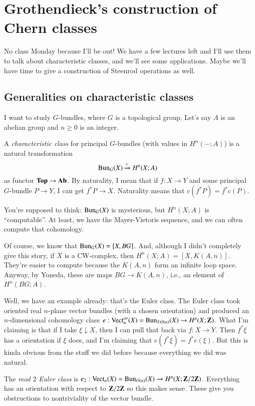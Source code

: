 \section{Grothendieck's construction of Chern classes}
No class Monday because I'll be out!
We have a few lectures left and I'll use them to talk about characteristic classes, and we'll see some applications.
Maybe we'll have time to give a construction of Steenrod operations as well.
\subsection{Generalities on characteristic classes}
I want to study $G$-bundles, where $G$ is a topological group.
Let's say $A$ is an abelian group and $n\geq 0$ is an integer.
\begin{definition}
    A \emph{characteristic class} for principal $G$-bundles (with values in $H^n(-;A)$) is a natural transformation
    $$
    \mathrm{Bun}_G(X) \xrightarrow{{c}} H^n(X;A)
    $$
    as functor $\mathbf{Top}\to \mathbf{Ab}$.
    By naturality, I mean that if $f:X\to Y$ and some principal $G$-bundle $P\to Y$, I can get $f^\ast P\to X$.
    Naturality means that $c(f^\ast P) = f^\ast c(P)$.
\end{definition}
You're supposed to think: $\mathrm{Bun}_G(X)$ is mysterious, but $H^n(X;A)$ is ``computable''.
At least, we have the Mayer-Vietoris sequence, and we can often compute that cohomology.

Of course, we know that $\mathrm{Bun}_G(X) = [X,BG]$.
And, although I didn't completely give this story, if $X$ is a CW-complex, then $H^n(X;A) = [X,K(A,n)]$.
They're easier to compute because the $K(A,n)$ form an infinite loop space.
Anyway, by Yoneda, these are maps $BG\to K(A,n)$, i.e., an element of $H^n(BG;A)$.

Well, we have an example already: that's the Euler class.
The Euler class took oriented real $n$-plane vector bundles (with a chosen orientation) and produced an $n$-dimensional cohomology class $e:\operatorname{Vect}^{or}_n(X) = \mathrm{Bun}_{SO(n)}(X)\to H^n(X;\mathbf Z)$.
What I'm claiming is that if I take $\xi\downarrow X$, then I can pull that back via $f:X \to Y$.
Then $f^\ast\xi$ has a orientation if $\xi$ does, and I'm claiming that $e(f^\ast\xi) = f^\ast e(\xi)$.
But this is kinda obvious from the stuff we did before because everything we did was natural.

The \emph{mod $2$ Euler class} is $e_2:\operatorname{Vect}_n(X) = \mathrm{Bun}_{O(n)}(X) \to H^n(X;\mathbf Z/2\mathbf Z)$.
Everything has an orientation with respect to $\mathbf Z/2\mathbf Z$ so this makes sense.
These give you obstructions to nontriviality of the vector bundle.

